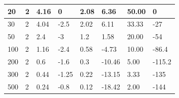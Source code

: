 \documentclass[dvipdfmx,titlepage,a4j]{jsarticle}  %
\begin{document}
\begin{table}[H]
\begin{tabular}{ll|ll|llll}
  \multicolumn{1}{l|}{20}            & 2           & \multicolumn{1}{l|}{4.16}        & 0               & \multicolumn{1}{l|}{2.08}    & \multicolumn{1}{l|}{6.36}            & \multicolumn{1}{l|}{50.00}           & 0                                   \\ \hline
  \multicolumn{1}{l|}{30}            & 2           & \multicolumn{1}{l|}{4.04}        & -2.5            & \multicolumn{1}{l|}{2.02}    & \multicolumn{1}{l|}{6.11}            & \multicolumn{1}{l|}{33.33}           & -27                                 \\ \hline
  \multicolumn{1}{l|}{50}            & 2           & \multicolumn{1}{l|}{2.4}         & -3              & \multicolumn{1}{l|}{1.2}     & \multicolumn{1}{l|}{1.58}            & \multicolumn{1}{l|}{20.00}           & -54                                 \\ \hline
  \multicolumn{1}{l|}{100}           & 2           & \multicolumn{1}{l|}{1.16}        & -2.4            & \multicolumn{1}{l|}{0.58}    & \multicolumn{1}{l|}{-4.73}           & \multicolumn{1}{l|}{10.00}           & -86.4                               \\ \hline
  \multicolumn{1}{l|}{200}           & 2           & \multicolumn{1}{l|}{0.6}         & -1.6            & \multicolumn{1}{l|}{0.3}     & \multicolumn{1}{l|}{-10.46}          & \multicolumn{1}{l|}{5.00}            & -115.2                              \\ \hline
  \multicolumn{1}{l|}{300}           & 2           & \multicolumn{1}{l|}{0.44}        & -1.25           & \multicolumn{1}{l|}{0.22}    & \multicolumn{1}{l|}{-13.15}          & \multicolumn{1}{l|}{3.33}            & -135                                \\ \hline
  \multicolumn{1}{l|}{500}           & 2           & \multicolumn{1}{l|}{0.24}        & -0.8            & \multicolumn{1}{l|}{0.12}    & \multicolumn{1}{l|}{-18.42}          & \multicolumn{1}{l|}{2.00}            & -144                                \\ \hline
  \end{tabular}
\end{table}
\end{document}
